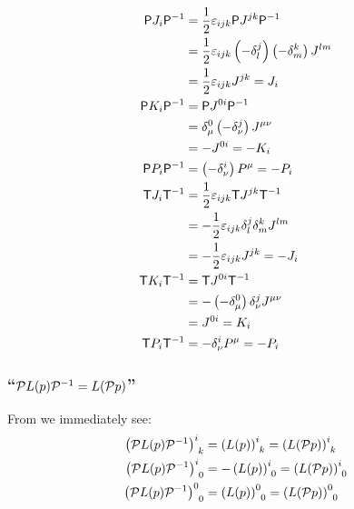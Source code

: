 \subsubsection{ }
\begin{align*} 
	\mathsf{P} J_i \mathsf{P}^{-1}&=\dfrac{1}{2}\varepsilon_{ijk} \mathsf{P} J^{jk} \mathsf{P}^{-1}\\
	&=\dfrac{1}{2}\varepsilon_{ijk}\left(-\delta^j_l\right)\left(-\delta^k_m\right)J^{lm} \\
	&=\dfrac{1}{2}\varepsilon_{ijk}J^{jk}=J_i\\
	\mathsf{P} K_i \mathsf{P}^{-1}&=\mathsf{P} J^{0i} \mathsf{P}^{-1}\\
	&=\delta^0_\mu \left(-\delta^j_\nu\right)J^{\mu\nu}\\
	&=-J^{0i}=-K_i\\
	\mathsf{P} P_i \mathsf{P}^{-1}&=\left(-\delta^i_\nu\right)P^\mu=-P_i\\
	\mathsf{T} J_i \mathsf{T}^{-1}&=\dfrac{1}{2}\varepsilon_{ijk} \mathsf{T} J^{jk} \mathsf{T}^{-1}\\
	&=-\dfrac{1}{2}\varepsilon_{ijk}\delta^j_l\delta^k_mJ^{lm} \\
	&=-\dfrac{1}{2}\varepsilon_{ijk}J^{jk}=-J_i\\
	\mathsf{T} K_i \mathsf{T}^{-1}&=\mathsf{T} J^{0i} \mathsf{T}^{-1}\\
	&=-\left(-\delta^0_\mu\right) \delta^j_\nu J^{\mu\nu}\\
	&=J^{0i}=K_i\\
	\mathsf{T} P_i \mathsf{T}^{-1}&=-\delta^i_\nu P^\mu=-P_i
\end{align*}

\subsubsection{\enquote{$\mathcal{\mathcal{P}} L(p)\mathcal{\mathcal{P}}^{-1}=L(\mathcal{\mathcal{P}} p)$} }
From  we immediately see:
\begin{align*} 
	\left(\mathcal{\mathcal{P}} L(p)\mathcal{\mathcal{P}}^{-1}\right)^i_{\hphantom{i}k}&=\left(L(p)\right)^i_{\hphantom{i}k}
	=\left(L(\mathcal{\mathcal{P}} p)\right)^i_{\hphantom{i}k}\\
	\left(\mathcal{\mathcal{P}} L(p)\mathcal{\mathcal{P}}^{-1}\right)^i_{\hphantom{i}0}&=-\left(L(p)\right)^i_{\hphantom{i}0}
	=\left(L(\mathcal{\mathcal{P}} p)\right)^i_{\hphantom{i}0}\\
	\left(\mathcal{\mathcal{P}} L(p)\mathcal{\mathcal{P}}^{-1}\right)^0_{\hphantom{0}0}&=\left(L(p)\right)^0_{\hphantom{0}0}
	=\left(L(\mathcal{\mathcal{P}} p)\right)^0_{\hphantom{0}0}
\end{align*}

